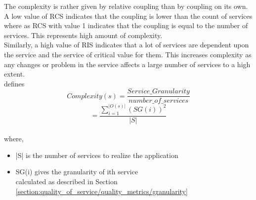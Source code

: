 {{{{{The complexity is rather given by relative coupling than by coupling on its own. A low value of RCS indicates that the coupling is lower than the count of services where as RCS with value 1 indicates that the coupling is equal to the number of services. This represents high amount of complexity.
\\
Similarly, a high value of RIS indicates that a lot of services are dependent upon the service and the service of critical value for them. This increases complexity as any changes or problem in the service affects a large number of services to a high extent.
\\
\cite{Saad-Alahmari:2011aa} defines
$$ Complexity(s) = \frac{Service\_Granularity}{number\_of\_services} $$ $$ =\frac{\sum_{i=1}^{|O(s)|}(SG(i))^2}{|S|}$$
\\
where,
\\
\begin{itemize}[leftmargin=.5in]
\item |S| is the number of services to realize the application
\item SG(i) gives the granularity of ith service 
\\calculated as described in Section \ref{section:quality_of_service/quality_metrics/granularity}
\end{itemize}


}}}}}
